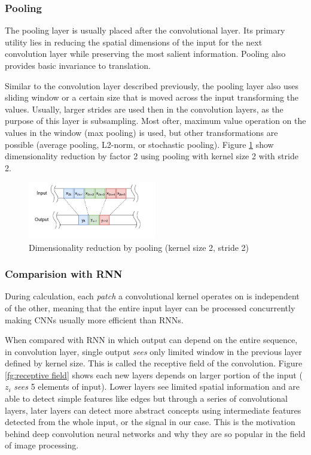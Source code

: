 \documentclass[times, utf8, diplomski, numeric, english]{fer}
\begin{document}
\subsubsection{Pooling}

The pooling layer is usually placed after the convolutional layer. Its primary utility lies in reducing the spatial dimensions of the input for the next convolution layer while preserving the most salient information. Pooling also provides basic invariance to translation.

Similar to the convolution layer described previously, the pooling layer also uses sliding window or a certain size that is moved across the input transforming the values. Usually, larger strides are used then in the convolution layers, as the purpose of this layer is subsampling. Most ofter, maximum value operation on the values in the window (max pooling) is used, but other transformations are possible (average pooling, L2-norm, or stochastic pooling).
Figure \ref{fg:pooling} show dimensionality reduction by factor 2 using pooling with kernel size 2 with stride 2.
\begin{figure}[!htb]
	\begin{center}
		\includegraphics[width=0.5\textwidth]{./imgs/pooling.png}
		\caption{Dimensionality reduction by pooling (kernel size 2, stride 2)}
		\label{fg:pooling}
	\end{center}
\end{figure}




  
\subsubsection{Comparision with RNN}


During calculation, each \textit{patch} a convolutional kernel operates on is independent of the other, meaning that the entire input layer can be processed concurrently making CNNs usually more efficient than RNNs. 

When compared with RNN in which output can depend on the entire sequence,  in convolution layer, single output \textit{sees} only limited window in the previous layer defined by kernel size. This is called the receptive field of the convolution. 
Figure \ref{fg:receptive field} shows each new layers depends on larger portion of the input ($z_i$ \textit{sees} 5 elements of input). 
Lower layers see limited spatial information and are able to detect simple features like edges but through a series of convolutional layers, later layers can detect more abstract concepts using intermediate features detected from the whole input, or the signal in our case. This is the motivation behind deep convolution neural networks and why they are so popular in the field of image processing.
\end{document}
